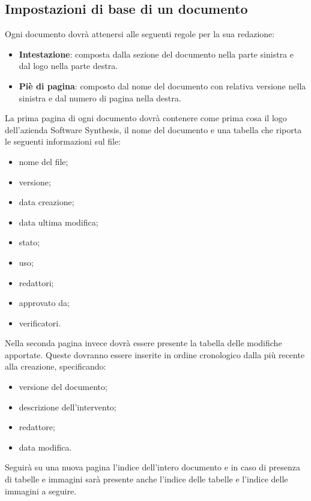 \subsection{Impostazioni di base di un documento}
Ogni documento dovrà attenersi alle seguenti regole per la sua redazione:
\begin{itemize}
\item \textbf{Intestazione}: composta dalla sezione del documento nella parte sinistra e dal logo nella parte destra.
\item \textbf{Piè di pagina}: composto dal nome del documento con relativa versione nella sinistra  e dal numero di pagina nella destra.
\end{itemize}
La prima pagina di ogni documento dovrà contenere come prima cosa il logo dell'azienda Software Synthesis, il nome del documento e una tabella che riporta le seguenti informazioni sul file:
\begin{itemize}
\item nome del file;
\item versione;
\item data creazione;
\item data ultima modifica;
\item stato;
\item uso;
\item redattori;
\item approvato da;
\item verificatori.
\end{itemize}

Nella seconda pagina invece dovrà essere presente la tabella delle modifiche apportate. Queste dovranno essere inserite in ordine cronologico dalla più recente alla creazione, specificando:
\begin{itemize}
\item versione del documento;
\item descrizione dell'intervento;
\item redattore;
\item data modifica.
\end{itemize}
Seguirà su una nuova pagina l'indice dell'intero documento e in caso di presenza di tabelle e immagini sarà presente anche l'indice delle tabelle e l'indice delle immagini a seguire.

